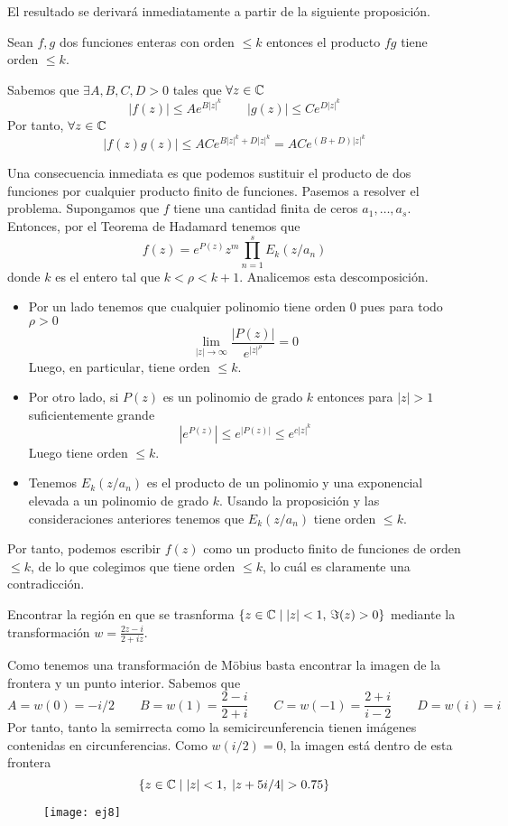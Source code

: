 \documentclass[twoside]{article}
\begin{document}
\begin{solucion}
El resultado se derivará inmediatamente a partir de la siguiente proposición. 
\begin{prop}
Sean $f,g$ dos funciones enteras con orden $\leq k$ entonces el producto $fg$ tiene orden $\leq k$.
\end{prop}
\begin{dem}
Sabemos que $\exists A,B,C,D>0$ tales que $\forall z\in \mathbb{C}$
$$
|f(z)|\leq Ae^{B|z|^k} \qquad |g(z)|\leq Ce^{D|z|^k}
$$
Por tanto, $\forall z \in \mathbb{C}$
$$
|f(z)g(z)| \leq ACe^{B|z|^k+D|z|^k} = ACe^{(B+D)|z|^k}
$$
\end{dem}
Una consecuencia inmediata es que podemos sustituir el producto de dos funciones por cualquier producto finito de funciones. Pasemos a resolver el problema. Supongamos que $f$ tiene una cantidad finita de ceros $a_1,\dotsc,a_s$. Entonces, por el Teorema de Hadamard tenemos que
$$
f(z)=e^{P(z)}z^m\prod_{n=1}^s E_k(z/a_n)
$$
donde $k$ es el entero tal que $k<\rho<k+1$. Analicemos esta descomposición. 
\begin{itemize}
\item Por un lado tenemos que cualquier polinomio tiene orden $0$ pues para todo $\rho>0$
$$
\lim_{|z|\to\infty} \frac{|P(z)|}{e^{|z|^\rho}} = 0
$$
Luego, en particular, tiene orden $\leq k$.
\item Por otro lado, si $P(z)$ es un polinomio de grado $k$ entonces para $|z|>1$ suficientemente grande
$$
|e^{P(z)}|\leq e^{|P(z)|}\leq e^{c|z|^k}
$$
Luego tiene orden $\leq k$. 
\item Tenemos $E_k(z/a_n)$ es el producto de un polinomio y una exponencial elevada a un polinomio de grado $k$. Usando la proposición y las consideraciones anteriores tenemos que $E_k(z/a_n)$ tiene orden $\leq k$. 
\end{itemize}
Por tanto, podemos escribir $f(z)$ como un producto finito de funciones de orden $\leq k$, de lo que colegimos que tiene orden $\leq k$, lo cuál es claramente una contradicción.
\end{solucion}
\newpage
\begin{ejercicio}{8}
Encontrar la región en que se trasnforma $\{z\in\mathbb{C}\mid |z|<1,\,\Im(z)>0\}$ mediante la transformación $w=\frac{2z-i}{2+iz}$.
\end{ejercicio}
\begin{solucion}
Como tenemos una transformación de Möbius basta encontrar la imagen de la frontera y un punto interior. Sabemos que $$A =w(0)=-i/2 \qquad B= w(1) = \frac{2-i}{2+i} \qquad C = w(-1) = \frac{2+i}{i-2} \qquad D=w(i) = i$$
Por tanto, tanto la semirrecta como la semicircunferencia tienen imágenes contenidas en circunferencias. Como $w(i/2)=0$, la imagen está dentro de esta frontera
$$
\{z\in \C \mid |z|< 1,\; |z+5i/4|>0.75\}
$$
\begin{figure}[h]
\texttt{[image: ej8]}
\centering
\end{figure}
\end{solucion}
\newpage
\end{document}
